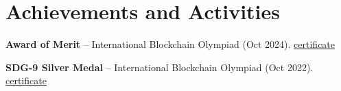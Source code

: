 \documentclass[letterpaper,11pt]{article}
\begin{document}
\section{Achievements and Activities}
\begin{itemize}[leftmargin=0.15in]
    \small{
        \item{\textbf{Award of Merit} -- International Blockchain Olympiad (Oct 2024). \href{https://drive.google.com/file/d/1JBwTW0jXm-M77g4E_a-D2NaJUHX4EyMg/view?usp=sharing}{\color{blue}certificate}}
        \vspace{-4pt}
        \item{\textbf{SDG-9 Silver Medal} -- International Blockchain Olympiad (Oct 2022). \href{https://drive.google.com/file/d/1r5VAn4hBUb7fEbmXG34dBFAzPjVzIfWr/view?usp=sharing}{\color{blue}certificate}}
    }
\end{itemize}
\end{document}
